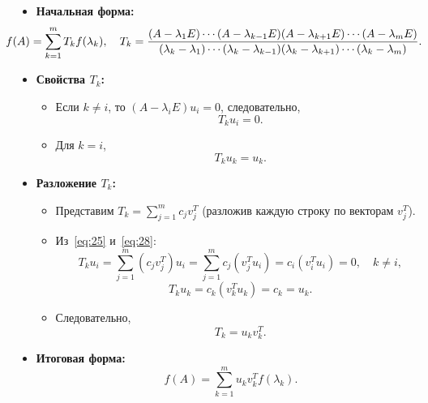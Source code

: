 	\begin{itemize}
		\item \textbf{Начальная форма:}
		\begin{equation}
			\hspace{-3em}f(A) = \sum_{k=1}^m T_k f(\lambda_k), \quad T_k = \frac{(A - \lambda_1 E) \cdots (A - \lambda_{k-1} E)(A - \lambda_{k+1} E) \cdots (A - \lambda_m E)}{(\lambda_k - \lambda_1) \cdots (\lambda_k - \lambda_{k-1})(\lambda_k - \lambda_{k+1}) \cdots (\lambda_k - \lambda_m)}.
		\end{equation}
		\item \textbf{Свойства \(T_k\):}
		\begin{itemize}
			\item Если \(k \neq i\), то \((A - \lambda_i E) u_i = 0\), следовательно,
			\begin{equation}
				T_k u_i = 0. \label{eq:28}
			\end{equation}
			\item Для \(k = i\),
			\begin{equation}
				T_k u_k = u_k.
			\end{equation}
		\end{itemize}
		\item \textbf{Разложение \(T_k\):}
		\begin{itemize}
			\item Представим \(T_k = \sum_{j=1}^m c_j v_j^T\) (разложив каждую строку по векторам \(v_j^T\)).
			\item Из~\eqref{eq:25} и~\eqref{eq:28}:
			\begin{equation}
				T_k u_i = \sum_{j=1}^m (c_j v_j^T)u_i = \sum_{j=1}^m c_j (v_j^T u_i) = c_i (v_i^T u_i) = 0, \quad k \neq i,
			\end{equation}
			\begin{equation}
				T_k u_k = c_k (v_k^T u_k) = c_k = u_k.
			\end{equation}
			\item Следовательно,
			\begin{equation}
				T_k = u_k v_k^T.
			\end{equation}
		\end{itemize}
		\item \textbf{Итоговая форма:}
		\begin{equation}
			f(A) = \sum_{k=1}^m u_k v_k^T f(\lambda_k).
		\end{equation}
	\end{itemize}
	
	\newpage
	

